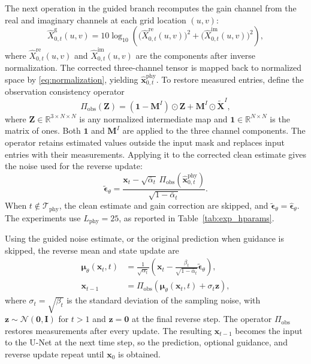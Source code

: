 \documentclass[lettersize,journal]{IEEEtran}
\newcommand{\vect}[1]{\boldsymbol{#1}}
\newcommand{\mat}[1]{\mathbf{#1}}
\newcommand{\R}{\mathbb{R}}
\newcommand{\od}{\odot}
\begin{document}
The next operation in the guided branch recomputes the gain channel from the real and imaginary channels at each grid location $(u,v)$:
\begin{equation}
    \widehat{X}^{\mathrm g}_{0,t}(u,v)=10\log_{10}\!\left(\big(\widehat{X}^{\mathrm{re}}_{0,t}(u,v)\big)^2+\big(\widehat{X}^{\mathrm{im}}_{0,t}(u,v)\big)^2\right),
    \label{eq:physics_projection}
\end{equation}
where $\widehat{X}^{\mathrm{re}}_{0,t}(u,v)$ and $\widehat{X}^{\mathrm{im}}_{0,t}(u,v)$ are the components after inverse normalization. The corrected three-channel tensor is mapped back to normalized space by \eqref{eq:normalization}, yielding $\widehat{\mat{x}}^{\mathrm{phy}}_{0,t}$. To restore measured entries, define the observation consistency operator
\begin{equation}
	\Pi_{\mathrm{obs}}(\mat{Z})=(\mat{1}-\mat{M}^{I})\od\mat{Z}+\mat{M}^{I}\od\widetilde{\mat{X}}^{I},
	\label{eq:obs_projection}
\end{equation}
where $\mat{Z}\in\mathbb{R}^{3\times N\times N}$ is any normalized intermediate map and $\mat{1}\in\R^{N\times N}$ is the matrix of ones. Both $\mat{1}$ and $\mat{M}^{I}$ are applied to the three channel components. The operator retains estimated values outside the input mask and replaces input entries with their measurements. Applying it to the corrected clean estimate gives the noise used for the reverse update:
\begin{equation}
    \widetilde{\vect{\epsilon}}_{\theta}
    =
    \frac{\mat{x}_t-\sqrt{\bar{\alpha}_t}\,
    \Pi_{\mathrm{obs}}(\widehat{\mat{x}}^{\mathrm{phy}}_{0,t})}
    {\sqrt{1-\bar{\alpha}_t}}.
    \label{eq:guided_noise_update}
\end{equation}
When $t\notin\mathcal{T}_{\mathrm{phy}}$, the clean estimate and gain correction are skipped, and $\widetilde{\vect{\epsilon}}_{\theta}=\widehat{\vect{\epsilon}}_{\theta}$. The experiments use $L_{\mathrm{phy}}=25$, as reported in Table~\ref{tab:exp_hparams}.

Using the guided noise estimate, or the original prediction when guidance is skipped, the reverse mean and state update are
\begin{align}
    \boldsymbol{\mu}_{\theta}(\mat{x}_t,t)
    &=
    \frac{1}{\sqrt{\alpha_t}}
    \left(
    \mat{x}_t-
    \frac{\beta_t}{\sqrt{1-\bar{\alpha}_t}}\widetilde{\vect{\epsilon}}_{\theta}
    \right),
    \label{eq:reverse_mean} \\
    \mat{x}_{t-1}
    &=
    \Pi_{\mathrm{obs}}\!\left(
    \boldsymbol{\mu}_{\theta}(\mat{x}_t,t)+\sigma_t\vect{z}
    \right),
    \label{eq:reverse_update}
\end{align}
where $\sigma_t=\sqrt{\beta_t}$ is the standard deviation of the sampling noise, with $\vect{z}\sim\mathcal{N}(\mat{0},\mat{I})$ for $t>1$ and $\vect{z}=\mat{0}$ at the final reverse step. The operator $\Pi_{\mathrm{obs}}$ restores measurements after every update. The resulting $\mat{x}_{t-1}$ becomes the input to the U-Net at the next time step, so the prediction, optional guidance, and reverse update repeat until $\mat{x}_0$ is obtained.
\end{document}
